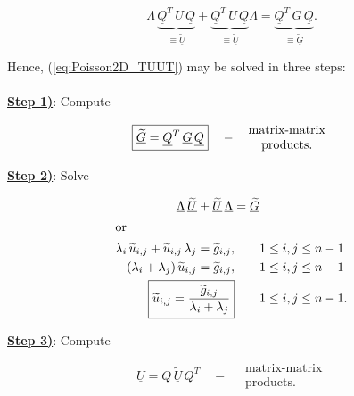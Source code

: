 \documentclass[11pt]{article}
\begin{document}
\begin{equation*}
  \underline{{\Lambda}} \,\underset{\equiv \underline{{\widetilde{U}}}}{\underbrace{\underline{{Q}}^T\, \underline{{U}}\, \underline{{Q}}}} + \underset{\equiv \underline{{\widetilde{U}}}}{\underbrace{\underline{{Q}}^T\, \underline{{U}}\, \underline{{Q}}}}
\underline{{\Lambda}} = \underset{\equiv \underline{{\widetilde{G}}}}{\underbrace{\underline{{Q}}^T\, \underline{G}\, \underline{{Q}}}}.
\end{equation*}

Hence, (\ref{eq:Poisson2D_TUUT}) may be solved in three steps:\\ \\


\underline{\textbf{Step 1)}}: Compute

\begin{equation*}
  \boxed{ \underline{{\widetilde{G}}} = \underline{{Q}}^T\, \underline{{G}}\, \underline{{Q}} } \quad - \quad  
  \begin{matrix}
    \text{matrix-matrix} \\
    \text{products}.
  \end{matrix} \\
\end{equation*}

\underline{\textbf{Step 2)}}: Solve

\begin{align*}
  \underline{{\Lambda}} \, \underline{{\widetilde{U}}} + \underline{{\widetilde{U}}} \, \underline{{\Lambda}} = \underline{{\widetilde{G}}} & \\
  \intertext{or}
  \lambda_i \,\widetilde{u}_{i,j} + \widetilde{u}_{i,j}\, \lambda_j = \widetilde{g}_{i,j},  \qquad &1 \leq i,j \leq n-1 \\
  (\lambda_i + \lambda_j)\, \widetilde{u}_{i,j} = \widetilde{g}_{i,j},  \qquad &1 \leq i,j \leq n-1 \\
  \boxed{ \widetilde{u}_{i,j} = \frac{\widetilde{g}_{i,j}}{\lambda_i + \lambda_j}} \qquad &1 \leq i,j \leq n-1. \\
\end{align*}

\underline{\textbf{Step 3)}}: Compute 

\begin{equation*}
  \boxed{ \underline{{U}} = \underline{{Q}}\, \underline{{\widetilde{U}}} \,\underline{{Q}}^T } \quad - \quad  
  \begin{matrix}
    \text{matrix-matrix} \\
    \text{products}.
  \end{matrix}
\end{equation*}
\end{document}
